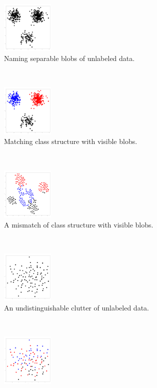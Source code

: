 \begin{figure}
	\centering
	\begin{subfigure}[t]{0.45\textwidth}
	    \centering
        \includegraphics[height=2.5cm]{figures/clusters_impl.pdf}
        \caption{Naming separable blobs of unlabeled data.}
    \end{subfigure}
    ~
    \begin{subfigure}[t]{0.45\textwidth}
	    \centering
        \includegraphics[height=2.5cm]{figures/clusters_expl.pdf}
        \caption{Matching class structure with visible blobs.}
    \end{subfigure}
    ~
    \begin{subfigure}[t]{0.45\textwidth}
	    \centering
        \includegraphics[height=2.5cm]{figures/clusters_expl_mismatch.pdf}
        \caption{A mismatch of class structure with visible blobs.}
    \end{subfigure}
    ~
    \begin{subfigure}[t]{0.45\textwidth}
	    \centering
        \includegraphics[height=2.5cm]{figures/blob_impl.pdf}
        \caption{An undistinguishable clutter of unlabeled data.}
    \end{subfigure}
    ~
    \begin{subfigure}[t]{0.45\textwidth}
	    \centering
        \includegraphics[height=2.5cm]{figures/blob_expl.pdf}

\end{subfigure}
\end{figure}
